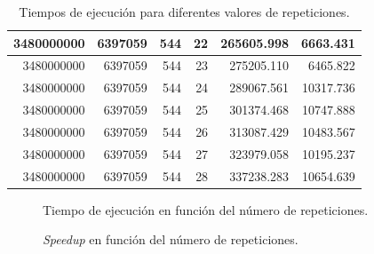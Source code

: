 \documentclass{article}
\begin{document}
\begin{table}[H]
\begin{adjustbox}{width=\textwidth, keepaspectratio}
\begin{tabular}{|r|r|r|r|r|r|}
						3480000000 & 6397059 & 544 & 22 & 265605.998 & 6663.431 \\ \hline
						3480000000 & 6397059 & 544 & 23 & 275205.110 & 6465.822 \\ \hline
						3480000000 & 6397059 & 544 & 24 & 289067.561 & 10317.736 \\ \hline
						3480000000 & 6397059 & 544 & 25 & 301374.468 & 10747.888 \\ \hline
						3480000000 & 6397059 & 544 & 26 & 313087.429 & 10483.567 \\ \hline
						3480000000 & 6397059 & 544 & 27 & 323979.058 & 10195.237 \\ \hline
						3480000000 & 6397059 & 544 & 28 & 337238.283 & 10654.639 \\ \hline
					\end{tabular}
				\end{adjustbox}
				\caption{Tiempos de ejecución para diferentes valores de repeticiones.}
				\label{tab:resultados3}
			\end{table}

			\begin{figure}
				\centering
				\caption{Tiempo de ejecución en función del número de repeticiones.}
				\label{fig:repts_vs_time_3}
			\end{figure}

			\begin{figure}
				\centering
				\caption{\textit{Speedup} en función del número de repeticiones.}
				\label{fig:speedup_vs_repts_3}
			\end{figure}
\end{document}
